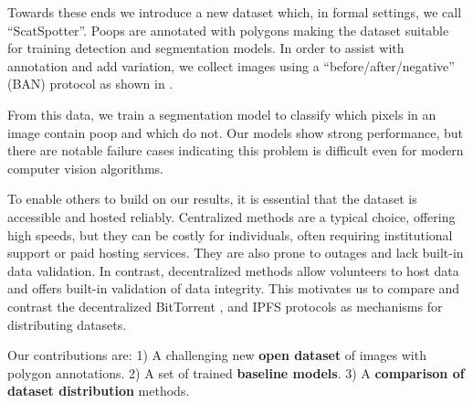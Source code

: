 Towards these ends we introduce a new dataset which, 
in formal settings, we call ``ScatSpotter''.
Poops are annotated with polygons making the dataset suitable for training detection and segmentation
  models.
In order to assist with annotation and add variation, we collect images using a ``before/after/negative'' (BAN)
  protocol as shown in .

From this data, we train a segmentation model to classify which pixels in an image contain poop and which do
  not.
Our models show strong performance, but there are notable failure cases indicating this problem is difficult
  even for modern computer vision algorithms. 

To enable others to build on our results, it is essential that the dataset is accessible and hosted
  reliably.
Centralized methods are a typical choice, offering high speeds, but they can be costly for individuals,
  often requiring institutional support or paid hosting services.
They are also prone to outages and lack built-in data validation.
In contrast, decentralized methods allow volunteers to host data and offers built-in validation of data
  integrity.
This motivates us to compare and contrast the decentralized BitTorrent \cite{cohen_incentives_2003}, and
  IPFS \cite{benet_ipfs_2014} protocols as mechanisms for distributing datasets.


Our contributions are:
1) A challenging new \textbf{open dataset} of images with polygon annotations.
2) A set of trained \textbf{baseline models}.
3) A \textbf{comparison of dataset distribution} methods.
